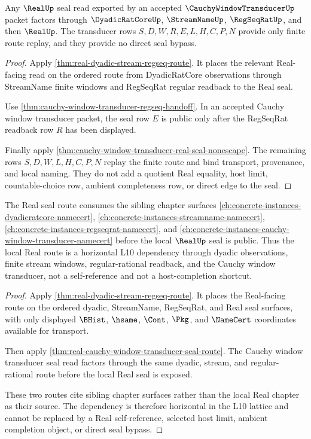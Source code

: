 \begin{theorem}
\label{thm:real-cauchy-window-transducer-seal-route}
Any $\RealUp$ seal read exported by an accepted $\CauchyWindowTransducerUp$ packet factors through $\DyadicRatCoreUp$, $\StreamNameUp$, $\RegSeqRatUp$, and then $\RealUp$. The transducer rows $S,D,W,R,E,L,H,C,P,N$ provide only finite route replay, and they provide no direct seal bypass.
\end{theorem}
\begin{proof}
Apply \autoref{thm:real-dyadic-stream-regseq-route}. It places the relevant Real-facing read on the ordered route from DyadicRatCore observations through StreamName finite windows and RegSeqRat regular readback to the Real seal.

Use \autoref{thm:cauchy-window-transducer-regseq-handoff}. In an accepted Cauchy window transducer packet, the seal row $E$ is public only after the RegSeqRat readback row $R$ has been displayed.

Finally apply \autoref{thm:cauchy-window-transducer-real-seal-nonescape}. The remaining rows $S,D,W,L,H,C,P,N$ replay the finite route and bind transport, provenance, and local naming. They do not add a quotient Real equality, host limit, countable-choice row, ambient completeness row, or direct edge to the seal.
\end{proof}

\begin{theorem}
\label{thm:real-streamname-regseqrat-sibling-nonorphan-route}
The Real seal route consumes the sibling chapter surfaces \autoref{ch:concrete-instances-dyadicratcore-namecert}, \autoref{ch:concrete-instances-streamname-namecert}, \autoref{ch:concrete-instances-regseqrat-namecert}, and \autoref{ch:concrete-instances-cauchy-window-transducer-namecert} before the local $\RealUp$ seal is public. Thus the local Real route is a horizontal L10 dependency through dyadic observations, finite stream windows, regular-rational readback, and the Cauchy window transducer, not a self-reference and not a host-completion shortcut.
\end{theorem}
\begin{proof}
Apply \autoref{thm:real-dyadic-stream-regseq-route}. It places the Real-facing route on the ordered dyadic, StreamName, RegSeqRat, and Real seal surfaces, with only displayed $\BHist$, $\hsame$, $\Cont$, $\Pkg$, and $\NameCert$ coordinates available for transport.

Then apply \autoref{thm:real-cauchy-window-transducer-seal-route}. The Cauchy window transducer seal read factors through the same dyadic, stream, and regular-rational route before the local Real seal is exposed.

These two routes cite sibling chapter surfaces rather than the local Real chapter as their source. The dependency is therefore horizontal in the L10 lattice and cannot be replaced by a Real self-reference, selected host limit, ambient completion object, or direct seal bypass.
\end{proof}

